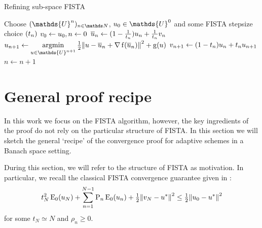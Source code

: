 \documentclass[10pt,a4paper,onecolumn]{article}
\numberwithin{equation}{section}
\let\F\mathds\let\C\mathcal\newcommand{\R}{\F{R}}\newcommand{\A}{\C{A}}
\newcommand{\norm}[1]{{\left\lVert #1 \right\rVert}}
\newcommand{\op}[1]{\operatorname{#1}}\newcommand{\overtext}[2]{\stackrel{\text{#1}}{#2}}
\renewcommand{\bar}{\overline}\renewcommand{\hat}{\widehat}\renewcommand{\tilde}{\widetilde}
\DeclareMathOperator*{\argmin}{argmin}\DeclareMathOperator{\TV}{TV}
\newcommand*{\Func}[1]{%
	\IfEqCase{#1}{%
		{0}{\op{E}}%
		{1}{\op{F}}%
		{2}{\op{G}}%
		{3}{\op{H}}%
	}[\op{F}#1]%
}
\newcommand*{\func}[1]{%
	\IfEqCase{#1}{%
		{0}{\op{e}}%
		{1}{\op{f}}%
		{2}{\op{g}}%
		{3}{\op{h}}%
	}[\op{f}#1]%
}
\newcommand*{\varf}[1]{%
	\IfEqCase{#1}{%
		{0}{u}%
		{1}{v}%
		{2}{w}%
	}[u#1]%
}
\newcommand*{\spcf}[1]{%
	\IfEqCase{#1}{%
		{0}{\F{U}}%
		{1}{\F{V}}%
		{2}{\F{W}}%
	}[\F{U}#1]%
}
\newcommand*{\vart}[1]{%
	\IfEqCase{#1}{%
		{0}{s}%
		{1}{t}%
	}[t#1]%
}
\begin{document}
\begin{algorithm}[b!]\caption{Refining sub-space FISTA}\label{alg:ca: refining FISTA}
	\centering
	\begin{algorithmic}[1]
		\State Choose $(\spcf0^n)_{n\in\F N}$, $\varf0_0\in \spcf0^0$ and some FISTA stepsize choice $(\vart1_n)$
		\State $\varf1_0\gets \varf0_0, n\gets0$
		\Repeat
		\State $\bar{\varf0}_n \gets (1-\tfrac{1}{\vart1_n})\varf0_n + \tfrac{1}{\vart1_n}\varf1_n$
		\State $\displaystyle \varf0_{n+1} \gets \argmin_{\varf0\in \spcf0^{n+1}} \tfrac12\norm{\varf0-\bar{\varf0}_n+\nabla \func1(\bar{\varf0}_n)}^2+\func2(\varf0)$
		\State $\varf1_{n+1} \gets (1-\vart1_n)\varf0_n + \vart1_n\varf0_{n+1}$
		\State $n\gets n+1$
	\end{algorithmic}
\end{algorithm}


\section{General proof recipe}\label{sec:ca: recipe}
In this work we focus on the FISTA algorithm, however, the key ingredients of the proof do not rely on the particular structure of FISTA. In this section we will sketch the general `recipe' of the convergence proof for adaptive schemes in a Banach space setting.

During this section, we will refer to the structure of FISTA as motivation. In particular, we recall the classical FISTA convergence guarantee given in \cite[Theorem 2]{Chambolle2015}:
\begin{equation}\label{eq:ca: classical FISTA}
	t_N^2\Func0_0(\varf0_N) + \sum^{N-1}_{n=1}\rho_n\Func0_0(\varf0_n) + \tfrac12\norm{\varf1_N-\varf0^*}^2 \leq \tfrac12\norm{\varf0_0-\varf0^*}^2
\end{equation}
for some $t_N\simeq N$ and $\rho_n\geq0$.
\end{document}
